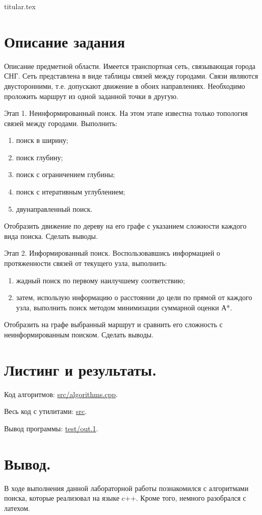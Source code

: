 \documentclass[11pt, a4paper]{article}
\begin{document}
{titular.tex}
\newpage

\section{Описание задания}

\noindent
Описание предметной области. Имеется транспортная сеть, связывающая
города СНГ. Сеть представлена в виде таблицы связей между городами. Связи
являются двусторонними, т.е. допускают движение в обоих направлениях.
Необходимо проложить маршрут из одной заданной точки в другую.

\medskip\noindent
Этап 1. Неинформированный поиск. На этом этапе известна только
топология связей между городами. Выполнить:
\begin{enumerate}
  \item поиск в ширину;
  \item поиск глубину;
  \item поиск с ограничением глубины;
  \item поиск с итеративным углублением;
  \item двунаправленный поиск.
\end{enumerate}

\noindent
Отобразить движение по дереву на его графе с указанием сложности
каждого вида поиска. Сделать выводы.

\medskip\noindent
Этап 2. Информированный поиск. Воспользовавшись информацией о
протяженности связей от текущего узла, выполнить:

\begin{enumerate}
  \item жадный поиск по первому наилучшему соответствию;
  \item затем, использую информацию о расстоянии до цели по прямой от
  каждого узла, выполнить поиск методом минимизации суммарной оценки А*.
\end{enumerate}

\noindent
Отобразить на графе выбранный маршрут и сравнить его сложность с
неинформированным поиском. Сделать выводы.

\section{Листинг и результаты.}

\noindent Код алгоритмов: \href{https://github.com/zubrailx/University-ITMO/blob/main/Year-3/Artificial-intelligence/lab-2/src/algorithms.cpp}{src/algorithms.cpp}.

\noindent Весь код с утилитами: \href{https://github.com/zubrailx/University-ITMO/tree/main/Year-3/Artificial-intelligence/lab-2/src}{src}.

\noindent Вывод программы: \href{https://github.com/zubrailx/University-ITMO/blob/main/Year-3/Artificial-intelligence/lab-2/test/out.1}{test/out.1}.

\section{Вывод.}

\noindent В ходе выполнения данной лабораторной работы познакомился с алгоритмами поиска, которые реализовал на языке c++. Кроме того, 
немного разобрался с латехом.
\end{document}
